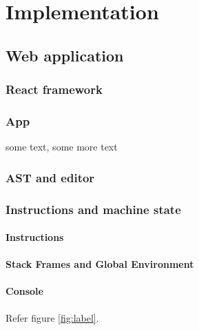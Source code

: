 \chapter{Implementation}

\section{Web application}

\subsection{React framework}

\subsection{App}
some text\cite{citation-2-name-here}, some more text
\subsection{AST and editor}

\subsection{Instructions and machine state}

\subsubsection{Instructions}

\subsubsection{Stack Frames and Global Environment}

\subsubsection{Console}

Refer figure \ref{fig:label}.

